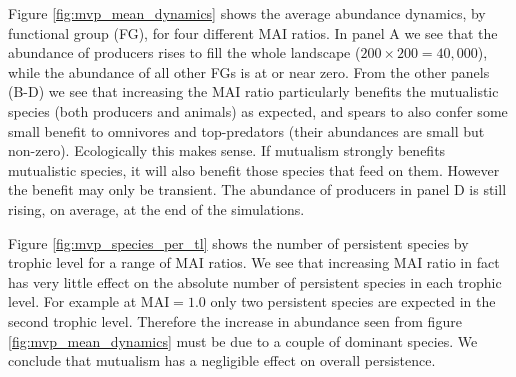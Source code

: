 
Figure \ref{fig:mvp_mean_dynamics} shows the average abundance dynamics, by functional group (FG), for four different MAI ratios. In panel A we see that the abundance of producers rises to fill the whole landscape ($200 \times 200=40,000$), while the abundance of all other FGs is at or near zero. From the other panels (B-D) we see that increasing the MAI ratio particularly benefits the mutualistic species (both producers and animals) as expected, and spears to also confer some small benefit to omnivores and top-predators (their abundances are small but non-zero). Ecologically this makes sense. If mutualism strongly benefits mutualistic species, it will also benefit those species that feed on them. However the benefit may only be transient. The abundance of producers in panel D is still rising, on average, at the end of the simulations. 



Figure \ref{fig:mvp_species_per_tl} shows the number of persistent species by trophic level for a range of MAI ratios. We see that increasing MAI ratio in fact has very little effect on the absolute number of persistent species in each trophic level. For example at MAI$=1.0$ only two persistent species are expected in the second trophic level. Therefore the increase in abundance seen from figure \ref{fig:mvp_mean_dynamics} must be due to a couple of dominant species. We conclude that mutualism has a negligible effect on overall persistence.

